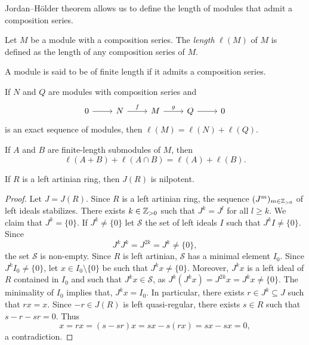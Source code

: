 Jordan--H\"older theorem allows us to define the 
length of modules that admit a composition series. 

\begin{definition}
    Let $M$ be a module with a composition series. 
    The \emph{length} $\ell(M)$ of $M$ is defined as the length of any composition series of $M$. 
\end{definition}

A module is said to be of 
finite length if it admits a composition series. 

\begin{exercise}
	If $N$ and $Q$ are modules with composition series and  
	\[
	\begin{tikzcd}
		0 \arrow[r]
		& N \arrow{r}{f}
		& M \arrow{r}{g}
		& Q \arrow[r]
		& 0
	\end{tikzcd}
	\]
	is an exact sequence of modules, then $\ell(M)=\ell(N)+\ell(Q)$.
\end{exercise}


\begin{exercise}
	If $A$ and $B$ are finite-length submodules of $M$, then  
	\[
	\ell(A+B)+\ell(A\cap B)=\ell(A)+\ell(B).
	\]
\end{exercise}

\begin{theorem}
	\label{thm:Jnilpotente}
	If $R$ is a left artinian ring, then $J(R)$ is nilpotent. 
\end{theorem}

\begin{proof}
	Let $J=J(R)$. Since $R$ is a left artinian ring, the sequence 
	$(J^m)_{m\in\mathbb{Z}_{>0}}$ of left ideals stabilizes. There exists 
	$k\in\mathbb{Z}_{>0}$ such that $J^k=J^l$ for all $l\geq k$. We claim that $J^k=\{0\}$. If
	$J^k\ne\{0\}$ let $\mathcal{S}$ the set of left ideals 
	$I$ such that $J^kI\ne\{0\}$. Since 
	\[
	J^kJ^k=J^{2k}=J^k\ne\{0\},
	\]
	the set $\mathcal{S}$ is non-empty. 
	Since $R$ is left artinian, $\mathcal{S}$ has a minimal element $I_0$. Since $J^kI_0\ne\{0\}$, let $x\in
	I_0\setminus\{0\}$ be such that $J^kx\ne\{0\}$. Moreover, $J^kx$ is a left ideal of $R$ 
	contained in $I_0$ and such that $J^kx\in\mathcal{S}$, as 
	$J^k(J^kx)=J^{2k}x=J^kx\ne\{0\}$. The minimality of $I_0$ implies that, $J^kx=I_0$. In particular, 
	there exists $r\in J^k\subseteq J$ such that $rx=x$. Since $-r\in
	J(R)$ is left quasi-regular, there exists $s\in R$ such that $s-r-sr=0$.
	Thus 
	\[
		x=rx=(s-sr)x=sx-s(rx)=sx-sx=0,
	\]
	a contradiction.
\end{proof}

